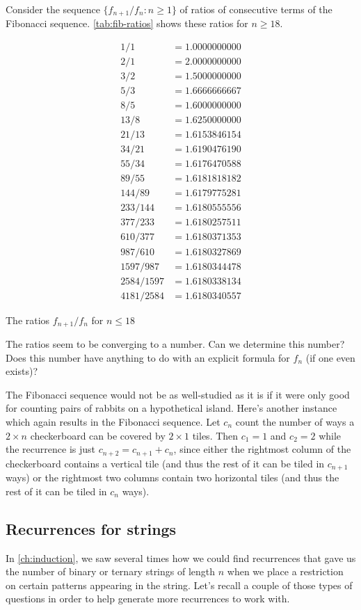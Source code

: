 Consider the sequence $\{f_{n+1}/f_n:n\ge1\}$ of ratios of consecutive
terms of the Fibonacci sequence. \autoref{tab:fib-ratios} shows these
ratios for $n\geq 18$.
\begin{table}
\begin{align*}
1/1 &= 1.0000000000\\
2/1 &= 2.0000000000\\
3/2 &= 1.5000000000\\
5/3 &= 1.6666666667\\
8/5 &= 1.6000000000\\
13/8 &= 1.6250000000\\
21/13 &= 1.6153846154\\
34/21 &= 1.6190476190\\
55/34 &= 1.6176470588\\
89/55 &= 1.6181818182\\
144/89 &= 1.6179775281\\
233/144 &= 1.6180555556\\
377/233 &= 1.6180257511\\
610/377 &= 1.6180371353\\
987/610 &= 1.6180327869\\
1597/987 &= 1.6180344478\\
2584/1597 &= 1.6180338134\\
4181/2584 &= 1.6180340557
\end{align*}
\caption{The ratios $f_{n+1}/f_{n}$ for $n\leq 18$\label{tab:fib-ratios}}
\end{table}
The ratios seem to be converging to a number.  Can we determine this
number? Does this number have anything to do with an explicit formula
for $f_n$ (if one even exists)?

\begin{example}
  The Fibonacci sequence would not be as well-studied as it is if it
  were only good for counting pairs of rabbits on a hypothetical
  island. Here's another instance which again results in the Fibonacci
  sequence.  Let $c_n$ count the number of ways a $2\times n$
  checkerboard can be covered by $2\times 1$ tiles.  Then $c_1=1$ and
  $c_2=2$ while the recurrence is just $c_{n+2} = c_{n+1}+c_n$, since
  either the rightmost column of the checkerboard contains a vertical
  tile (and thus the rest of it can be tiled in $c_{n+1}$ ways) or the
  rightmost two columns contain two horizontal tiles (and thus the
  rest of it can be tiled in $c_n$ ways).
\end{example}


\subsection{Recurrences for strings}\label{s:recurrence:intro:strings}
In \autoref{ch:induction}, we saw several times how we could  find
recurrences that gave us the number of binary or ternary strings of
length $n$ when we place a restriction on certain patterns appearing
in the string. Let's recall a couple of those types of questions in
order to help generate more recurrences to work with.

